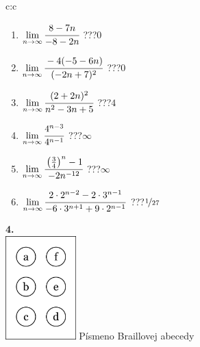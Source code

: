 \documentclass[10pt]{report}
\begin{document}
\begin{tabular}{c:c}
\begin{minipage}[c][104.5mm][t]{0.5\linewidth}
\begin{center}
\begin{minipage}{0.79\linewidth}
\begin{center}
\begin{varwidth}{\linewidth}
\begin{enumerate}
\normalsize
\item $\lim\limits_{n\to\infty}\cfrac{8-7n}{-8-2n}$\quad \dotfill\; ???\;\dotfill \quad $0$
\item $\lim\limits_{n\to\infty}\cfrac{-4(-5-6n)}{(-2n+7)^2}$\quad \dotfill\; ???\;\dotfill \quad $0$
\item $\lim\limits_{n\to\infty}\cfrac{(2+2n)^2}{n^2-3n+5}$\quad \dotfill\; ???\;\dotfill \quad $4$
\item $\lim\limits_{n\to\infty}\cfrac{4^{n-3}}{4^{n-1}}$\quad \dotfill\; ???\;\dotfill \quad $\infty$
\item $\lim\limits_{n\to\infty}\cfrac{\left(\frac{3}{4}\right)^n -1}{-2n^{-12}}$\quad \dotfill\; ???\;\dotfill \quad $\infty$
\item $\lim\limits_{n\to\infty}\cfrac{2\cdot 2^{n-2}-2\cdot 3^{n-1}}{-6\cdot 3^{n+1}+9\cdot 2^{n-1}}$\quad \dotfill\; ???\;\dotfill \quad $\nicefrac{1}{27}$
\end{enumerate}
\end{varwidth}
\end{center}
\end{minipage}
\begin{minipage}{0.20\linewidth}
\begin{center}
{\Huge\bfseries 4.} \\[2mm]
\includegraphics[height=40mm]{../images/braille.png}
{\small Písmeno Braillovej abecedy}
\end{center}
\end{minipage}
\end{center}
\end{minipage}
%
\end{tabular}
\newpage
\thispagestyle{empty}
\end{document}
